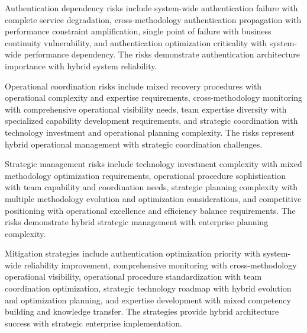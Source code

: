 Authentication dependency risks include system-wide authentication failure with complete service degradation, cross-methodology authentication propagation with performance constraint amplification, single point of failure with business continuity vulnerability, and authentication optimization criticality with system-wide performance dependency. The risks demonstrate authentication architecture importance with hybrid system reliability.

Operational coordination risks include mixed recovery procedures with operational complexity and expertise requirements, cross-methodology monitoring with comprehensive operational visibility needs, team expertise diversity with specialized capability development requirements, and strategic coordination with technology investment and operational planning complexity. The risks represent hybrid operational management with strategic coordination challenges.

Strategic management risks include technology investment complexity with mixed methodology optimization requirements, operational procedure sophistication with team capability and coordination needs, strategic planning complexity with multiple methodology evolution and optimization considerations, and competitive positioning with operational excellence and efficiency balance requirements. The risks demonstrate hybrid strategic management with enterprise planning complexity.

Mitigation strategies include authentication optimization priority with system-wide reliability improvement, comprehensive monitoring with cross-methodology operational visibility, operational procedure standardization with team coordination optimization, strategic technology roadmap with hybrid evolution and optimization planning, and expertise development with mixed competency building and knowledge transfer. The strategies provide hybrid architecture success with strategic enterprise implementation.